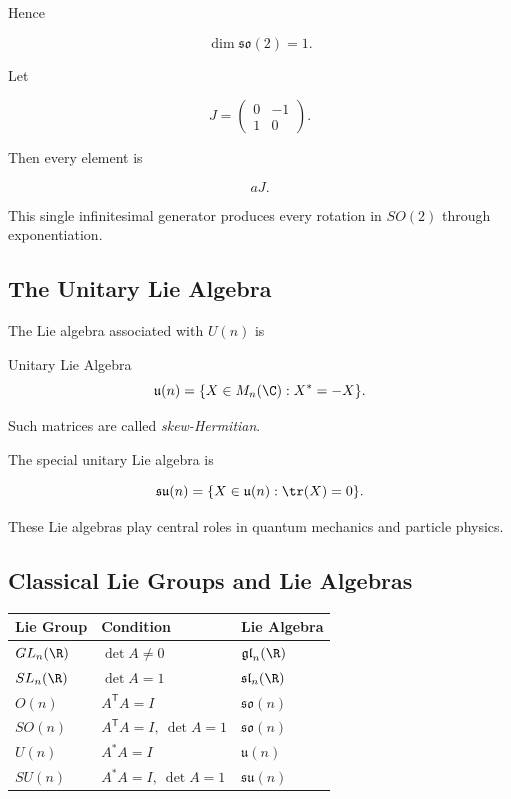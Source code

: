 Hence

\[ \dim\mathfrak{so}(2)=1. \]

Let

\[ J=
\begin{pmatrix}
0&-1\\
1&0
\end{pmatrix}. \]

Then every element is

\[ aJ. \]

This single infinitesimal generator produces every rotation in \(SO(2)\)
through exponentiation.

\subsection{The Unitary Lie Algebra}
\label{subsec:unitary-lie-algebra}

The Lie algebra associated with \(U(n)\) is

\begin{definitionbox}{Unitary Lie Algebra}
\[ \mathfrak{u}(n)=\{X\in M_n(\C):X^*=-X\}. \]
\end{definitionbox}

Such matrices are called \emph{skew-Hermitian}.

The special unitary Lie algebra is

\[ \mathfrak{su}(n)=\{X\in\mathfrak{u}(n):\tr(X)=0\}. \]

These Lie algebras play central roles in quantum mechanics and particle
physics.

\subsection{Classical Lie Groups and Lie Algebras}
\label{subsec:classical-lie-groups-algebras}

\begin{center}
\begin{tabularx}{0.96\textwidth}{@{}lXl@{}}
\toprule
\textbf{Lie Group} & \textbf{Condition} & \textbf{Lie Algebra}\\
\midrule
\(GL_n(\R)\) & \(\det A\neq0\) & \(\mathfrak{gl}_n(\R)\)\\
\(SL_n(\R)\) & \(\det A=1\) & \(\mathfrak{sl}_n(\R)\)\\
\(O(n)\) & \(A^{\mathsf T}A=I\) & \(\mathfrak{so}(n)\)\\
\(SO(n)\) & \(A^{\mathsf T}A=I,\ \det A=1\) & \(\mathfrak{so}(n)\)\\
\(U(n)\) & \(A^*A=I\) & \(\mathfrak{u}(n)\)\\
\(SU(n)\) & \(A^*A=I,\ \det A=1\) & \(\mathfrak{su}(n)\)\\
\bottomrule
\end{tabularx}
\end{center}


